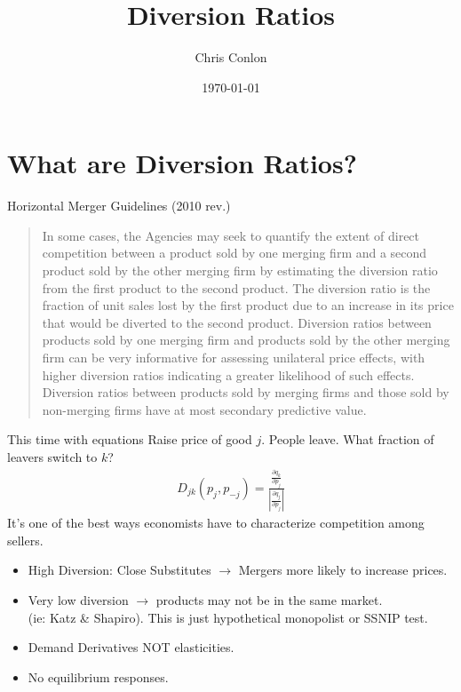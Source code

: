 \documentclass[aspectratio=169,10pt]{beamer}
\title{Diversion Ratios}
\author{Chris Conlon}
\institute{Grad IO}
\date{\today}
\begin{document}
\frame{\titlepage}
\section{What are Diversion Ratios?} 

\begin{frame}{Horizontal Merger Guidelines (2010 rev.)}
\begin{quote}
In some cases, the Agencies may seek to quantify the extent of direct competition between a product sold by one merging firm and a second product sold by the other merging firm by estimating the diversion ratio from the first product to the second product. The diversion ratio is the \alert{fraction of unit sales lost by the first product due to an increase in its price that would be diverted to the second product}. Diversion ratios between products sold by one merging firm and products sold by the other merging firm can be very informative for assessing unilateral price effects, with \alert{higher diversion ratios indicating a greater likelihood of such effects}. Diversion ratios between products sold by merging firms and those sold by \alert{non-merging firms have at most secondary predictive value.}
\end{quote}
\end{frame}

\begin{frame}{This time with equations}
 Raise price of good $j$. People leave. What fraction of leavers switch to $k$?
\begin{eqnarray*}
D_{jk} (p_j,p_{-j})= \frac{\frac{\partial q_k}{\partial p_j}}{\left|\frac{\partial q_j}{\partial p_j} \right|}
\end{eqnarray*}
It's one of the best ways economists have to characterize competition among sellers.
\begin{itemize}
\item High Diversion: Close Substitutes $\rightarrow$ Mergers more likely to increase prices.
\item Very low diversion $\rightarrow$ products may not be in the same market.\\ (ie: Katz \& Shapiro). This is just hypothetical monopolist or SSNIP test.
\item Demand Derivatives NOT elasticities.
\item No equilibrium responses.
\end{itemize}
\end{frame}
\end{document}
